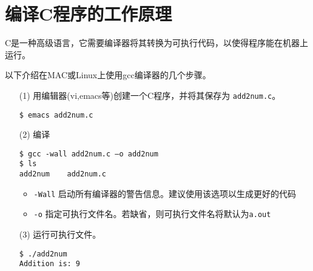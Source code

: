 \section{编译C程序的工作原理}
\begin{frame}\ft{\secname}
C是一种高级语言，它需要编译器将其转换为可执行代码，以使得程序能在机器上运行。 

以下介绍在MAC或Linux上使用gcc编译器的几个步骤。

\end{frame}


\begin{frame}[fragile]\ft{\secname}
\begin{itemize}

\item[(1)] 用编辑器(vi,emacs等)创建一个C程序，并将其保存为 \lstinline|add2num.c|。

\begin{lstlisting}
$ emacs add2num.c
\end{lstlisting} 

\pause 


\end{itemize}
\end{frame}

\begin{frame}[fragile]\ft{\secname}
\begin{itemize}
\item[(2)] 编译 
\begin{lstlisting}
$ gcc -wall add2num.c –o add2num
$ ls
add2num    add2num.c
\end{lstlisting}
\begin{itemize}
	\item \lstinline|-Wall| \quad 启动所有编译器的警告信息。建议使用该选项以生成更好的代码 \\[.1in]
	\item \lstinline|-o| \quad 指定可执行文件名。若缺省，则可执行文件名将默认为\lstinline|a.out|
\end{itemize} 
\end{itemize}
\end{frame}

\begin{frame}[fragile]\ft{\secname}
\begin{itemize}
\item[(3)] 运行可执行文件。


\begin{lstlisting}
$ ./add2num
Addition is: 9
\end{lstlisting}

\end{itemize}
\end{frame}



